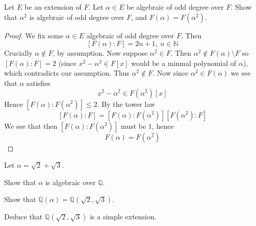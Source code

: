 \begin{prob}
    Let $E$ be an extension of $F$. Let $\alpha \in E$ 
    be algebraic of odd degree over $F$. Show that $\alpha^2$ 
    is algebraic of odd degree over $F$, and $F(\alpha) = 
    F(\alpha^2)$.
\end{prob}
\begin{proof}
    We fix some $\alpha \in E$ algebraic of odd degree over $F$.
    Then 
    \[
        [F(\alpha) : F] = 2n + 1, \ n \in \mathbb N 
    \]
    Crucially $\alpha \not \in F$, by assumption.
    Now suppose $\alpha^2 \in F$. 
    Then $\alpha^2 \not\in F(\alpha) \setminus F$ so 
    $[F(\alpha):F] = 2$ (since $x^2 - \alpha^2 \in F[x]$ would be a 
    minmal polynomial of $\alpha$), which contradicts our assumption. 
    Thus $\alpha^2 \not\in F$. 
    Now since $\alpha^2 \in F(\alpha)$ we see that 
    $\alpha$ satisfies 
    \[
        x^2 - \alpha^2 \in F(\alpha^2)[x]
    \]
    Hence $[F(\alpha) : F(\alpha^2)] \leq 2$. By the tower law 
    \[
        [F(\alpha) : F] = [F(\alpha) : F(\alpha^2)][F(\alpha^2):F]
    \]
    We see that then $[F(\alpha) : F(\alpha^2)]$ must be $1$, 
    hence 
    \[
        F(\alpha) = F(\alpha^2)
    \]
\end{proof}
\begin{prob}
    Let $\alpha = \sqrt 2 + \sqrt 3$.

    Show that $\alpha$ is algebraic over $\mathbb Q$.

    Show that $\mathbb Q(\alpha) = \mathbb Q(\sqrt 2, \sqrt 3)$.

    Deduce that $\mathbb Q(\sqrt 2, \sqrt 3)$ is a simple extension.
\end{prob}
